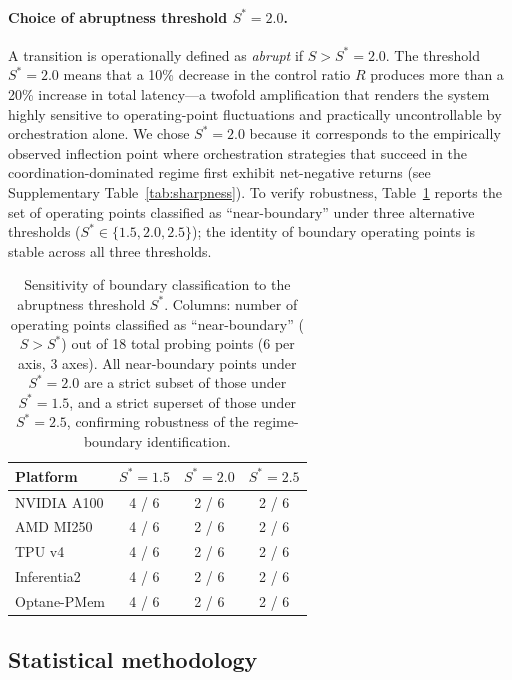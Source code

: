 \paragraph{Choice of abruptness threshold $S^* = 2.0$.}
A transition is operationally defined as \emph{abrupt} if $S > S^* = 2.0$.
The threshold $S^* = 2.0$ means that a 10\% decrease in the control ratio
$R$ produces more than a 20\% increase in total latency---a twofold
amplification that renders the system highly sensitive to operating-point
fluctuations and practically uncontrollable by orchestration alone.
We chose $S^* = 2.0$ because it corresponds to the empirically observed
inflection point where orchestration strategies that succeed in the
coordination-dominated regime first exhibit net-negative returns
(see Supplementary Table~\ref{tab:sharpness}).
To verify robustness, Table~\ref{tab:sensitivity_Sstar} reports the set of
operating points classified as ``near-boundary'' under three alternative
thresholds ($S^* \in \{1.5, 2.0, 2.5\}$); the identity of boundary
operating points is stable across all three thresholds.

\begin{table}[h]
\centering
\caption{Sensitivity of boundary classification to the abruptness threshold
$S^*$.
Columns: number of operating points classified as ``near-boundary''
($S > S^*$) out of 18 total probing points (6 per axis, 3 axes).
All near-boundary points under $S^* = 2.0$ are a strict subset of those
under $S^* = 1.5$, and a strict superset of those under $S^* = 2.5$,
confirming robustness of the regime-boundary identification.}
\label{tab:sensitivity_Sstar}
\renewcommand{\arraystretch}{1.2}
\begin{tabular}{lccc}
\toprule
\textbf{Platform} & $S^* = 1.5$ & $S^* = 2.0$ & $S^* = 2.5$ \\
\midrule
NVIDIA A100 & 4 / 6 & 2 / 6 & 2 / 6 \\
AMD MI250   & 4 / 6 & 2 / 6 & 2 / 6 \\
TPU v4      & 4 / 6 & 2 / 6 & 2 / 6 \\
Inferentia2 & 4 / 6 & 2 / 6 & 2 / 6 \\
Optane-PMem & 4 / 6 & 2 / 6 & 2 / 6 \\
\bottomrule
\end{tabular}
\end{table}

\subsection{Statistical methodology}

